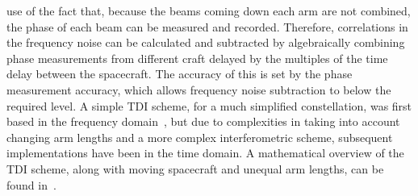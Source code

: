 \documentclass{article}
\begin{document}
use of the fact that, because the beams coming down each arm are not
combined, the phase of each beam can be measured and
recorded. Therefore, correlations in the frequency noise can be
calculated and subtracted by algebraically combining phase
measurements from different craft delayed by the multiples of the time
delay between the spacecraft. The accuracy of this is set by the phase
measurement accuracy, which allows frequency noise subtraction to
below the required level. A simple TDI scheme, for a much simplified
constellation, was first based in the frequency
domain~\cite{Giampieri}, but due to complexities in taking into
account changing arm lengths and a more complex interferometric scheme,
subsequent implementations have been in the time domain. A
mathematical overview of the TDI scheme, along with moving spacecraft
and unequal arm lengths, can be found in~\cite{Tinto:2005}.
\end{document}
